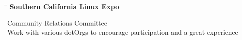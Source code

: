 \documentclass{res}
\begin{document}
\begin{resume}
	\vspace{-12pt}
   \vspace{-0.1in}	
   \begin{tabbing}
   \hspace{2.3in}\= \hspace{2.95in}\= \kill %
    {\bf Southern California Linux Expo} 
   \end{tabbing}\vspace{-20pt}      %
	 Community Relations Committee\\
	 Work with various dotOrgs to encourage participation and a great experience\\
\end{resume}
\end{document}
